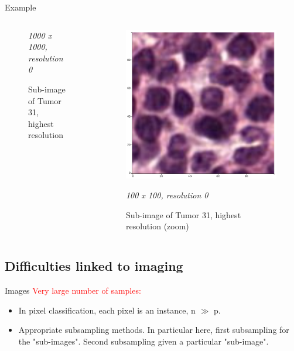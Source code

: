 \documentclass{beamer}
\begin{document}
\begin{frame}{Example}
\begin{columns}[T]
\begin{column}{.3\textwidth}
\begin{figure}[!ht]
\caption{Sub-image of Tumor 31, highest resolution}
\textit{1000 x 1000, resolution 0}
\label{}
\end{figure}
\end{column}%
\hfill%
\begin{column}{.3\textwidth}
\begin{figure}[!ht]
\centering
\includegraphics[width=\textwidth]{Tumor_31_res0_zoom.png}
\caption{Sub-image of Tumor 31, highest resolution (zoom)}
\textit{100 x 100, resolution 0}
\label{}
\end{figure}
\end{column}%
\end{columns}
\end{frame}

\subsection{Difficulties linked to imaging}

\begin{frame}{Images}
\textcolor{red}{Very large number of samples:}
\begin{itemize}
\item In pixel classification, each pixel is an instance, n $\gg$ p.
\item Appropriate subsampling methods. In particular here, first subsampling for the "sub-images". Second subsampling given a particular "sub-image".
\end{itemize}
\end{frame}
\end{document}
